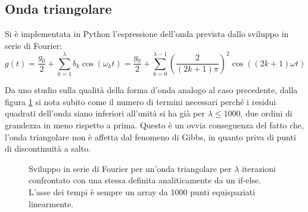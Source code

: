 \documentclass{article}[a4paper, oneside ,11pt]
\begin{document}
\subsection{Onda triangolare}
Si è implementata in Python l'espressione dell'onda prevista dallo sviluppo in serie di Fourier:
\begin{equation}
g(t)= \frac{g_0}{2} + \sum_{k=1}^{\lambda} b_k \cos{(\omega_kt)} = \frac{g_0}{2} + \sum_{k=0}^{\lambda-1} \left(\frac{2}{(2k+1)\pi}\right)^2 \cos{\left((2k+1)\omega t\right)}
\end{equation} 

Da uno studio sulla qualità della forma d'onda analogo al caso precedente, dalla figura \ref{plt:trg} si nota subito come il numero di termini necessari perché i residui quadrati dell'onda siano inferiori all'unità si ha già per $\lambda \leq 1000$, due ordini di grandezza in meno rispetto a prima. Questo è un ovvia conseguenza del fatto che, l'onda triangolare non è affetta dal fenomeno di Gibbs, in quanto priva di punti di discontinuità a salto.
\begin{figure}[!htb]
	\scalebox{0.55}{}\hfill \scalebox{0.55}{}
	\scalebox{0.55}{}\hfill \scalebox{0.55}{}
 	\caption{Sviluppo in serie di Fourier per un’onda triangolare per $\lambda$ iterazioni confrontato con una stessa definita analiticamente da un if-else. L'asse dei tempi è sempre un array da 1000 punti equispaziati linearmente. \label{plt:trg}}
\end{figure}

\end{document}
